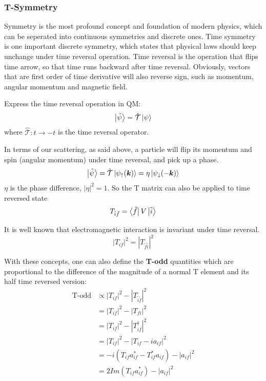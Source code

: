\subsubsection{T-Symmetry}
Symmetry is the most profound concept and foundation of modern physics, which
can be seperated into continuous symmetries and discrete ones. Time symmetry
is one important discrete symmetry, which states that physical laws should
keep unchange under time reversal operation. Time reversal is the operation
that flips time arrow, so that time runs backward after time reversal. Obviously, 
vectors that are first order of time derivative will also reverse sign, such
as momentum, angular momentum and magnetic field.

Express the time reversal operation in QM:
\begin{equation}
    \ket{\tilde{\psi}} = \hat{\mathcal{T}} \ket{\psi} 
\end{equation}
where $\hat{\mathcal{T}}: t \rightarrow -t$ is the time reversal operator. 

In terms of our scattering, as said above, a particle will flip its momentum 
and spin (angular momentum) under time reversal, and pick up a phase.
\begin{equation}
    \ket{\tilde{\psi}} = \hat{\mathcal{T}} \ket{\psi_\uparrow(\boldsymbol{k})} = \eta\ket{\psi_\downarrow(-\boldsymbol{k})}
\end{equation}
$\eta$ is the phase difference, $|\eta|^2 = 1$. So the T matrix can also be applied
to time reversed state
\begin{equation}
    T_{\tilde{i}\tilde{f}} = \bra{\tilde{f}} V \ket{\tilde{i}}
\end{equation}

It is well known that electromagnetic interaction is invariant under time reversal.
\begin{equation}
    |T_{if}|^2 = |T_{\tilde{f}\tilde{i}}|^2 
\end{equation}

With these concepts, one can also define the \textbf{T-odd} quantities which
are proportional to the difference of the magnitude of a normal T element and 
its half time reversed version:
\begin{equation}
    \begin{aligned}
	\text{T-odd} &\propto |T_{if}|^2 - |T_{\tilde{i}\tilde{f}}|^2	\\
	    &= |T_{if}|^2 - |T_{fi}|^2	\\
	    &= |T_{if}|^2 - |T^\dag_{if}|^2	\\
	    &= |T_{if}|^2 - |T_{if} - ia_{if}|^2	\\
	    &= -i(T_{if}a^*_{if} - T^*_{if}a_{if}) - |a_{if}|^2	\\
	    &= 2Im(T_{if}a^*_{if}) - |a_{if}|^2
    \end{aligned}
    \label{eq:T-odd}
\end{equation}

